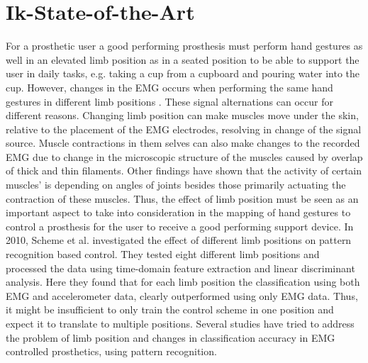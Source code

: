 \section{Ik-State-of-the-Art}

For a prosthetic user a good performing prosthesis must perform hand gestures as well in an elevated limb position as in a seated position to be able to support the user in daily tasks, e.g. taking a cup from a cupboard and pouring water into the cup. However, changes in the EMG occurs when performing the same hand gestures in different limb positions \cite{Fougner2011, avella2006}. These signal alternations can occur for different reasons. Changing limb position can make muscles move under the skin, relative to the placement of the EMG electrodes, resolving in change of the signal source. Muscle contractions in them selves can also make changes to the recorded EMG due to change in the microscopic structure of the muscles caused by overlap of thick and thin filaments. \cite{martini}  
Other findings have shown that the activity of certain muscles' is depending on angles of joints besides those primarily actuating the contraction of these muscles. \cite{Fougner2011} Thus, the effect of limb position must be seen as an important aspect to take into consideration in the mapping of hand gestures to control a prosthesis for the user to receive a good performing support device. %
In 2010, Scheme et al. investigated the effect of different limb positions on pattern recognition based control. They tested eight different limb positions and processed the data using time-domain feature extraction and linear discriminant analysis. Here they found that for each limb position the classification using both EMG and accelerometer data, clearly outperformed using only EMG data. Thus, it might be insufficient to only train the control scheme in one position and expect it to translate to multiple positions. \cite{Fougner2010} 
Several studies have tried to address the problem of limb position and changes in classification accuracy in EMG controlled prosthetics, using pattern recognition. %

